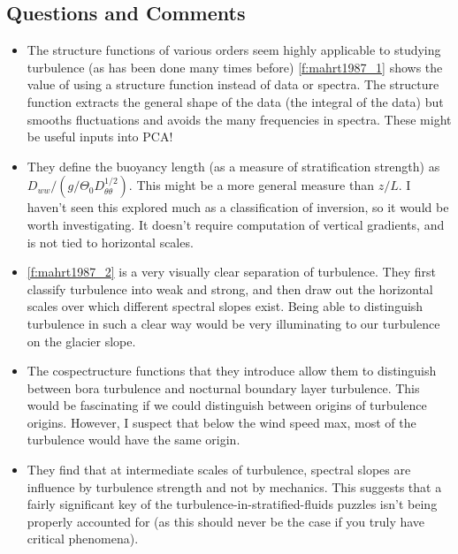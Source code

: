 \documentclass{article}
\begin{document}
\subsection*{Questions and Comments}
\begin{itemize}
\item The structure functions of various orders seem highly applicable to studying turbulence (as has been done many times before) \cref{f:mahrt1987_1} shows the value of using a structure function instead of data or spectra. The structure function extracts the general shape of the data (the integral of the data) but smooths fluctuations and avoids the many frequencies in spectra. These might be useful inputs into PCA!
\item They define the buoyancy length (as a measure of stratification strength) as \(D_{ww}/\left(g/\Theta_0D_{\theta\theta}^{1/2}\right)\). This might be a more general measure than $z/L$. I haven't seen this explored much as a classification of inversion, so it would be worth investigating. It doesn't require computation of vertical gradients, and is not tied to horizontal scales.
\item \cref{f:mahrt1987_2} is a very visually clear separation of turbulence. They first classify turbulence into weak and strong, and then draw out the horizontal scales over which different spectral slopes exist. Being able to distinguish turbulence in such a clear way would be very illuminating to our turbulence on the glacier slope.
\item The cospectructure functions that they introduce allow them to distinguish between bora turbulence and nocturnal boundary layer turbulence. This would be fascinating if we could distinguish between origins of turbulence origins. However, I suspect that below the wind speed max, most of the turbulence would have the same origin.
\item They find that at intermediate scales of turbulence, spectral slopes are influence by turbulence strength and not by mechanics. This suggests that a fairly significant key of the turbulence-in-stratified-fluids puzzles isn't being properly accounted for (as this should never be the case if you truly have critical phenomena).
\end{itemize}
\newpage



\def \sect {Ohata1989}
\section{\citeauthor{\sect} \citeyear{\sect}}
\textbf{\citefield{\sect}{title}\nocite{\sect}}
\end{document}
